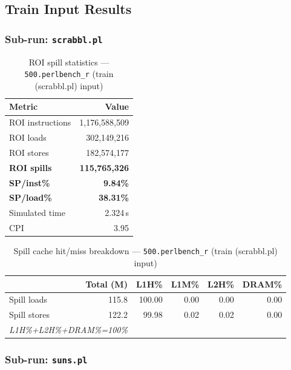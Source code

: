 \documentclass[11pt,a4paper]{article}
\begin{document}
\subsection{Train Input Results}

\subsubsection*{Sub-run: \texttt{scrabbl.pl}}

\begin{table}[H]
\centering
\caption{ROI spill statistics --- \texttt{500.perlbench\_r} (train (scrabbl.pl) input)}
\label{tab:perl_scrabbl_train (scrabbl.pl)_roi}
\begin{tabular}{lr}
\toprule
\textbf{Metric} & \textbf{Value} \\
\midrule
ROI instructions & 1,176,588,509 \\
ROI loads        & 302,149,216 \\
ROI stores       & 182,574,177 \\
\textbf{ROI spills}   & \textbf{115,765,326} \\
\textbf{SP/inst\%}   & \textbf{9.84\%} \\
\textbf{SP/load\%}   & \textbf{38.31\%} \\
Simulated time   & 2.324\,s \\
CPI              & 3.95 \\
\bottomrule
\end{tabular}
\end{table}

\begin{table}[H]
\centering
\caption{Spill cache hit/miss breakdown --- \texttt{500.perlbench\_r} (train (scrabbl.pl) input)}
\label{tab:perl_scrabbl_train (scrabbl.pl)_cache}
\begin{tabular}{lrrrrr}
\toprule
\textbf{} & \textbf{Total (M)} & \textbf{L1H\%} & \textbf{L1M\%} & \textbf{L2H\%} & \textbf{DRAM\%} \\
\midrule
Spill loads  & 115.8 & 100.00 & 0.00 & 0.00 & 0.00 \\
Spill stores & 122.2 & 99.98 & 0.02 & 0.02 & 0.00 \\
\multicolumn{2}{l}{\small\textit{L1H\%+L2H\%+DRAM\%=100\%}} \\
\bottomrule
\end{tabular}
\end{table}

\subsubsection*{Sub-run: \texttt{suns.pl}}
\end{document}
